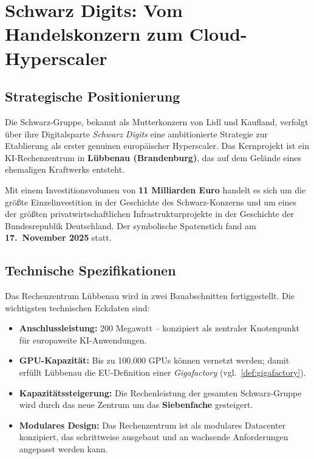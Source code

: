 \documentclass[12pt, a4paper, openany]{report}
\begin{document}
\section{Schwarz Digits: Vom Handelskonzern zum Cloud-Hyperscaler}
\label{sec:schwarz_digits}

\subsection{Strategische Positionierung}

Die Schwarz-Gruppe, bekannt als Mutterkonzern von Lidl und Kaufland, verfolgt
über ihre Digitalsparte \textit{Schwarz Digits} eine ambitionierte Strategie
zur Etablierung als erster genuinen europäischer Hyperscaler. Das Kernprojekt
ist ein KI-Rechenzentrum in \textbf{Lübbenau (Brandenburg)}, das auf dem
Gelände eines ehemaligen Kraftwerks entsteht.

Mit einem Investitionsvolumen von \textbf{11 Milliarden Euro} handelt es
sich um die größte Einzelinvestition in der Geschichte des Schwarz-Konzerns
und um eines der größten privatwirtschaftlichen Infrastrukturprojekte in der
Geschichte der Bundesrepublik Deutschland. Der symbolische Spatenstich fand
am \textbf{17.~November 2025} statt.

\subsection{Technische Spezifikationen}

Das Rechenzentrum Lübbenau wird in zwei Bauabschnitten fertiggestellt. Die
wichtigsten technischen Eckdaten sind:

\begin{itemize}[leftmargin=2em]
	\item \textbf{Anschlussleistung:} 200 Megawatt -- konzipiert als zentraler
	Knotenpunkt für europaweite KI-Anwendungen.
	\item \textbf{GPU-Kapazität:} Bis zu 100.000 GPUs können vernetzt werden;
	damit erfüllt Lübbenau die EU-Definition einer \emph{Gigafactory}
	(vgl.\ \cref{def:gigafactory}).
	\item \textbf{Kapazitätssteigerung:} Die Rechenleistung der gesamten
	Schwarz-Gruppe wird durch das neue Zentrum um das \textbf{Siebenfache}
	gesteigert.
	\item \textbf{Modulares Design:} Das Rechenzentrum ist als modulares Data\-center
	konzipiert, das schrittweise ausgebaut und an wachsende Anforderungen
	angepasst werden kann.
\end{itemize}
\end{document}

